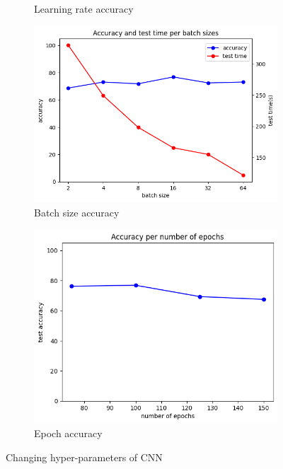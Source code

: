 \begin{figure}
\begin{subfigure}{0.23\linewidth}
		\caption{Learning rate accuracy}
		\label{fig:q4-7-lr}
	\end{subfigure}
	\hfill
	\begin{subfigure}{0.23\linewidth}
		\centering
		\includegraphics[width=\linewidth]{image/q4-7-batch.png}
		\caption{Batch size accuracy}
		\label{fig:q4-7-batch}
	\end{subfigure}
	\hfill
	\begin{subfigure}{0.23\linewidth}
		\centering
		\includegraphics[width=\linewidth]{image/q4-7-epoch.png}
		\caption{Epoch accuracy}
		\label{fig:q4-7-epoch}
	\end{subfigure}
	\caption{Changing hyper-parameters of CNN}
	\label{fig:q2}
\end{figure}

